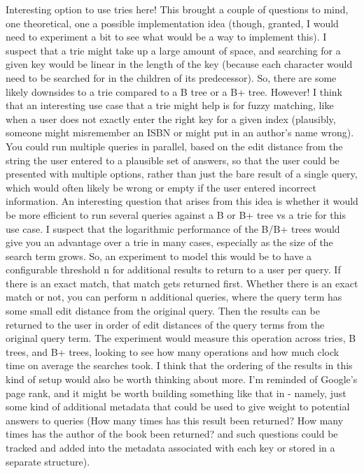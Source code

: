 \documentclass[10pt,letterpaper,final]{report}
\begin{document}
Interesting option to use tries here! This brought a couple of questions to mind, one theoretical, one a possible implementation idea (though, granted, I would need to experiment a bit to see what would be a way to implement this). I suspect that a trie might take up a large amount of space, and searching for a given key would be linear in the length of the key (because each character would need to be searched for in the children of its predecessor). So, there are some likely downsides to a trie compared to a B tree or a B+ tree. However! I think that an interesting use case that a trie might help is for fuzzy matching, like when a user does not exactly enter the right key for a given index (plausibly, someone might misremember an ISBN or might put in an author's name wrong). You could run multiple queries in parallel, based on the edit distance from the string the user entered to a plausible set of answers, so that the user could be presented with multiple options, rather than just the bare result of a single query, which would often likely be wrong or empty if the user entered incorrect information. An interesting question that arises from this idea is whether it would be more efficient to run several queries against a B or B+ tree vs a trie for this use case. I suspect that the logarithmic performance of the B/B+ trees would give you an advantage over a trie in many cases, especially as the size of the search term grows. So, an experiment to model this would be to have a configurable threshold n for additional results to return to a user per query. If there is an exact match, that match gets returned first. Whether there is an exact match or not, you can perform n additional queries, where the query term has some small edit distance from the original query. Then the results can be returned to the user in order of edit distances of the query terms from the original query term. The experiment would measure this operation across tries, B trees, and B+ trees, looking to see how many operations and how much clock time on average the searches took. I think that the ordering of the results in this kind of setup would also be worth thinking about more. I'm reminded of Google's page rank, and it might be worth building something like that in - namely, just some kind of additional metadata that could be used to give weight to potential answers to queries (How many times has this result been returned? How many times has the author of the book been returned? and such questions could be tracked and added into the metadata associated with each key or stored in a separate structure).
\end{document}
